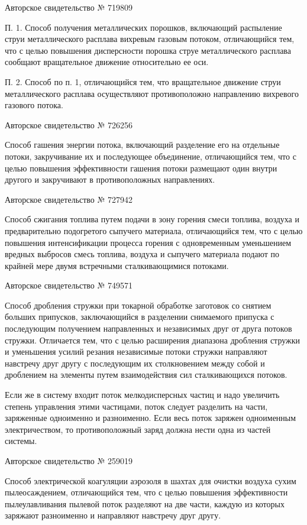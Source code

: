 Авторское свидетельство № 719809

П. 1.  Способ получения металлических порошков,  включающий распыление
струи металлического  расплава вихревым газовым  потоком, отличающийся
тем, что  с целью повышения дисперсности  порошка струе металлического
расплава сообщают вращательное движение относительно ее оси.

П.  2. Способ  по п.  1, отличающийся  тем, что  вращательное движение
струи металлического расплава  осуществляют противоположно направлению
вихревого газового потока.


Авторское свидетельство № 726256

Способ гашения энергии потока,  включающий разделение его на отдельные
потоки, закручивание  их и последующее объединение,  отличающийся тем,
что  с целью  повышения  эффективности гашения  потоки размещают  один
внутри другого и закручивают в противоположных направлениях.


Авторское свидетельство № 727942

Способ сжигания  топлива путем  подачи в  зону горения  смеси топлива,
воздуха и предварительно  подогретого сыпучего материала, отличающийся
тем,  что   с  целью  повышения  интенсификации   процесса  горения  с
одновременным  уменьшением  вредных  выбросов смесь  топлива,  воздуха
и  сыпучего   материала  подают  по  крайней   мере  двумя  встречными
сталкивающимися потоками.


Авторское свидетельство № 749571

Способ дробления  стружки при токарной обработке  заготовок со снятием
больших припусков,  заключающийся в  разделении снимаемого  припуска с
последующим  получением  направленных  и  независимых  друг  от  друга
потоков  стружки. Отличается  тем,  что с  целью расширения  диапазона
дробления  стружки  и  уменьшения усилий  резания  независимые  потоки
стружки направляют навстречу друг другу с последующим их столкновением
между  собой  и  дроблением   на  элементы  путем  взаимодействия  сил
сталкивающихся потоков.

Если же в систему входит поток мелкодисперсных частиц и надо увеличить
степень  управления  этими  частицами,   поток  следует  разделить  на
части, заряженные  одноименно и  разноименно. Если весь  поток заряжен
одноименным электричеством, то противоположный заряд должна нести одна
из частей системы.


Авторское свидетельство № 259019

Способ электрической коагуляции аэрозоля  в шахтах для очистки воздуха
сухим  пылеосаждением,   отличающийся  тем,  что  с   целью  повышения
эффективности пылеулавливания  пылевой поток  разделяют на  две части,
каждую  из которых  заряжают разноименно  и направляют  навстречу друг
другу.


